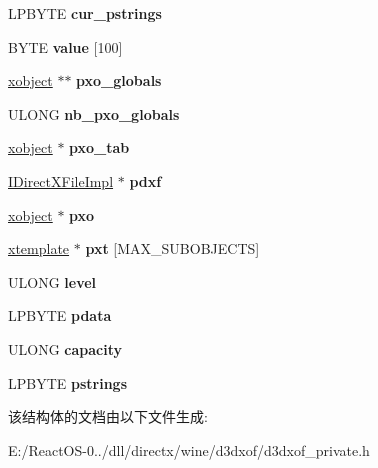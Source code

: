 \begin{DoxyCompactItemize}
\mbox{\label{structparse__buffer_a8e581ab0c464ff15385669b6dbf04e7c}} 
L\+P\+B\+Y\+TE {\bfseries cur\+\_\+pstrings}
\item 
\mbox{\label{structparse__buffer_a992cc2bbb686b43514dddfb3f302f374}} 
B\+Y\+TE {\bfseries value} \mbox{[}100\mbox{]}
\item 
\mbox{\label{structparse__buffer_af5ba19f0ed5c504df3f8c22e27a326e9}} 
\hyperlink{struct__xobject}{xobject} $\ast$$\ast$ {\bfseries pxo\+\_\+globals}
\item 
\mbox{\label{structparse__buffer_a918376044c49add56e568546b23d4a9b}} 
U\+L\+O\+NG {\bfseries nb\+\_\+pxo\+\_\+globals}
\item 
\mbox{\label{structparse__buffer_ad98b2de4995bcfc83c875ba344c8a2a5}} 
\hyperlink{struct__xobject}{xobject} $\ast$ {\bfseries pxo\+\_\+tab}
\item 
\mbox{\label{structparse__buffer_a573e34e7a6238bfa6b70944fea502924}} 
\hyperlink{struct_i_direct_x_file_impl}{I\+Direct\+X\+File\+Impl} $\ast$ {\bfseries pdxf}
\item 
\mbox{\label{structparse__buffer_a41cac61f26246ad40b636eb6c3cc5592}} 
\hyperlink{struct__xobject}{xobject} $\ast$ {\bfseries pxo}
\item 
\mbox{\label{structparse__buffer_ac582d274fcc7bc21ec4b5ce8370460ad}} 
\hyperlink{structxtemplate}{xtemplate} $\ast$ {\bfseries pxt} \mbox{[}M\+A\+X\+\_\+\+S\+U\+B\+O\+B\+J\+E\+C\+TS\mbox{]}
\item 
\mbox{\label{structparse__buffer_aac8030b802434c385f6fbb93a855165f}} 
U\+L\+O\+NG {\bfseries level}
\item 
\mbox{\label{structparse__buffer_a1fe38bd5beb29ce5c09bb46bce705137}} 
L\+P\+B\+Y\+TE {\bfseries pdata}
\item 
\mbox{\label{structparse__buffer_a61a215b28303c77e77aa7f6f523c8a1a}} 
U\+L\+O\+NG {\bfseries capacity}
\item 
\mbox{\label{structparse__buffer_acbc311b0b67858d27fe5b1cc6b467947}} 
L\+P\+B\+Y\+TE {\bfseries pstrings}
\end{DoxyCompactItemize}


该结构体的文档由以下文件生成\+:\begin{DoxyCompactItemize}
\item 
E\+:/\+React\+O\+S-\/0../dll/directx/wine/d3dxof/d3dxof\+\_\+private.\+h\end{DoxyCompactItemize}
